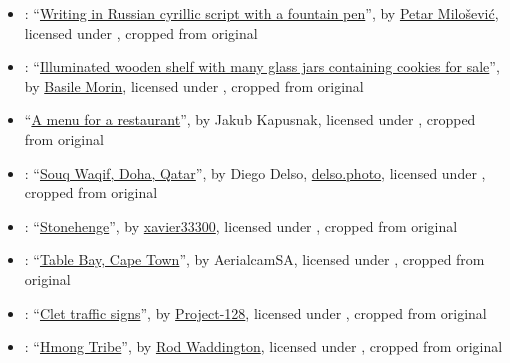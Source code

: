 \begin{itemize}
\item {}: ``\href{https://commons.wikimedia.org/wiki/File:Fountain_pen_writing_(literacy).jpg}{Writing in Russian cyrillic script with a fountain pen}'', by \href{https://commons.wikimedia.org/wiki/User:PetarM}{Petar Milošević}, licensed under , cropped from original

\item {}: ``\href{https://commons.wikimedia.org/wiki/File:Illuminated_wooden_shelf_with_many_glass_jars_containing_cookies_for_sale_in_Tokyo.jpg}{Illuminated wooden shelf with many glass jars containing cookies for sale}'', by \href{https://commons.wikimedia.org/wiki/User:Basile_Morin}{Basile Morin}, licensed under , cropped from original

\item {} ``\href{https://commons.wikimedia.org/wiki/File:Foodiesfeed.com_choosing-from-verde-cocina-menu.jpg}{A menu for a restaurant}'', by Jakub Kapusnak, licensed under , cropped from original

\item {}: ``\href{https://commons.wikimedia.org/wiki/File:Souq_Waqif,_Doha,_Catar,_2013-08-05,_DD_11.jpg}{Souq Waqif, Doha, Qatar}'', by Diego Delso, \href{http://delso.photo/}{delso.photo}, licensed under , cropped from original

\item {}: ``\href{https://www.flickr.com/photos/xavier33300/14884844251/}{Stonehenge}'', by \href{https://www.flickr.com/people/xavier33300/}{xavier33300}, licensed under , cropped from original

\item {}: ``\href{https://commons.wikimedia.org/wiki/File:Table_Bay,_Cape_Town.jpg}{Table Bay, Cape Town}'', by AerialcamSA, licensed under , cropped from original

\item {}: ``\href{https://www.flickr.com/photos/project-128/14187511671/}{Clet traffic signs}'', by \href{https://www.flickr.com/photos/project-128/}{Project-128}, licensed under , cropped from original

\item {}: ``\href{https://www.flickr.com/photos/rod_waddington/50004674731/}{Hmong Tribe}'', by \href{https://www.flickr.com/people/rod_waddington/}{Rod Waddington}, licensed under , cropped from original


\end{itemize}
